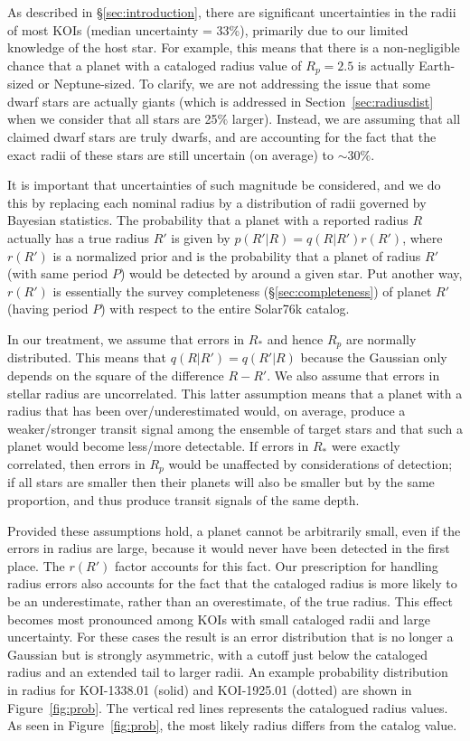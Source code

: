 As described in \S\ref{sec:introduction}, there are significant
uncertainties in the radii of most KOIs (median uncertainty = 33\%),
primarily due to our limited knowledge of the host star.  For example,
this means that there is a non-negligible chance that a planet
with a cataloged radius value of $R_p = 2.5$\rearth{}
is actually Earth-sized or Neptune-sized.  To clarify, we are not 
addressing the issue that some dwarf stars are actually giants 
(which is addressed in Section~\ref{sec:radiusdist}
when we consider that all stars are 25$\%$ larger). Instead,   
we are assuming that all claimed dwarf stars are truly dwarfs, and are 
accounting for the fact that the exact radii 
of these stars are still uncertain (on average) to $\sim 30 \%$. 

It is important that
uncertainties of such magnitude be considered, and we do this by
replacing each nominal radius by a distribution of radii governed by
Bayesian statistics.  The probability that a planet with a reported 
radius $R$ actually has a true radius
$R'$ is given by $p(R'|R) = q(R|R')r(R')$, where $r(R')$ is a
normalized prior and is the probability that a planet of radius 
$R'$ (with same period $P$) would be detected by \kep{} around a given 
star. Put another way, $r(R')$ is essentially the survey completeness 
(\S\ref{sec:completeness}) of planet $R'$ (having period $P$) with 
respect to the entire Solar76k catalog. 

In our treatment, we assume that errors in $R_*$ and hence $R_p$ are
normally distributed.  This means that
$q(R|R') = q(R'|R)$ because the Gaussian only depends on the square of
the difference $R-R'$.  We also assume that errors in stellar radius are 
uncorrelated.  This latter assumption means that a planet
with a radius that has been over/underestimated would, on average,
produce a weaker/stronger transit signal among the ensemble of target
stars and that such a planet would become less/more detectable.
If errors in $R_*$ were exactly correlated, then errors in $R_p$ would be
unaffected by considerations of detection; if all stars are smaller
then their planets will also be smaller but by the same proportion,
and thus produce transit signals of the same depth.

Provided these assumptions hold, a planet cannot be arbitrarily small,
even if the errors in radius are large, because it would never have
been detected in the first place. The $r(R')$ factor accounts for this 
fact. Our prescription for handling radius errors also accounts for 
the fact that the cataloged radius is more 
likely to be an underestimate, rather than an overestimate, of the 
true radius. This effect becomes most pronounced among KOIs with 
small cataloged radii and large uncertainty. For these cases the result is an error
distribution that is no longer a Gaussian but is strongly asymmetric,
with a cutoff just below the cataloged radius and an extended tail to
larger radii. An example probability distribution in radius
for KOI-1338.01 (solid) and KOI-1925.01 (dotted) are shown in 
Figure~\ref{fig:prob}. The vertical red lines represents the
catalogued radius values. As seen in Figure~\ref{fig:prob}, the 
most likely radius differs from the catalog value.

